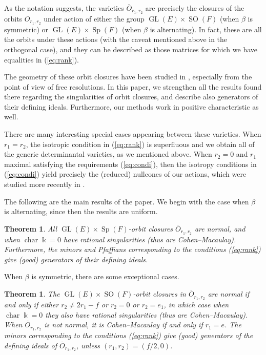 \documentclass[11pt]{amsart}
\numberwithin{equation}{section}
\newtheorem{theorem}[equation]{Theorem}
\theoremstyle{definition}
\DeclareMathOperator{\GL}{GL}
\DeclareMathOperator{\Sp}{Sp}
\DeclareMathOperator{\SO}{SO}
\DeclareMathOperator{\cha}{char}
\newcommand{\ol}{\overline}
\newcommand{\kk}{\Bbbk}
\begin{document}
As the notation suggests, the varieties $\ol{O}_{r_1,r_2}$ are precisely the closures of the orbits $O_{r_1,r_2}$ under action of either the group $\GL(E)\times \SO(F)$ (when $\beta$ is symmetric) or $\GL(E)\times \Sp(F)$ (when $\beta$ is alternating). In fact, these are all the orbits under these actions (with the caveat mentioned above in the orthogonal case), and they can be described as those matrices for which we have equalities in (\ref{eq:rank}).

\medskip

The geometry of these orbit closures have been studied in \cite{lovett05, lovett07}, especially from the point of view of free resolutions. In this paper, we strengthen all the results found there regarding the singularities of orbit closures, and describe also generators of their defining ideals. Furthermore, our methods work in positive characteristic as well.

There are many interesting special cases appearing between these varieties. When $r_1=r_2$, the isotropic condition in (\ref{eq:rank}) is superfluous and we obtain all of the generic determinantal varieties, as we mentioned above. When $r_2=0$ and $r_1$ maximal satisfying the requirements (\ref{eq:condi}), then the isotropy conditions in (\ref{eq:condi}) yield precisely the (reduced) nullcones of our actions, which were studied more recently in \cite{kraft,vaib1, vaib2}.

The following are the main results of the paper. We begin with the case when $\beta$ is alternating, since then the results are uniform.

\begin{theorem} \label{mainsymp}
All $\GL(E)\times \Sp(F)$-orbit closures $\ol{O}_{r_1, r_2}$ are normal, and when $\cha \kk = 0$ have rational singularities (thus are Cohen--Macaulay). Furthermore, the minors and Pfaffians corresponding to the conditions (\ref{eq:rank}) give (good) generators of their defining ideals.
\end{theorem}

When $\beta$ is symmetric, there are some exceptional cases.

\begin{theorem} \label{mainorth}
The $\GL(E)\times \SO(F)$-orbit closures in $\ol{O}_{r_1, r_2}$ are normal if and only if either $r_2\neq 2 r_1 - f$ or $r_2=0$ or $r_2=e_1$, in which case when $\cha \kk = 0$ they also have rational singularities (thus are Cohen--Macaulay). When  $\ol{O}_{r_1, r_2}$ is not normal, it is Cohen--Macaulay if and only if $r_1=e$. The minors corresponding to the conditions (\ref{eq:rank}) give (good) generators of the defining ideals of $\ol{O}_{r_1, r_2}$, unless $(r_1,r_2) = (f/2, 0)$.
\end{theorem}
\end{document}
